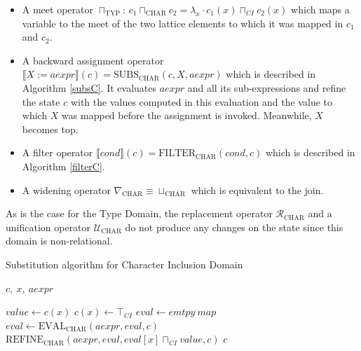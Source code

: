 \documentclass[10pt]{report}
\begin{document}
\begin{itemize}
	\item A meet operator $ \sqcap_{\mathrm{TYP}} $: $ c_{1} \sqcap_{\mathrm{CHAR}} c_{2} = \lambda_{x}\cdot c_{1}(x) \sqcap_{CI} c_{2}(x) $ which maps a variable to the meet of the two lattice elements to which it was mapped in $ c_{1} $ and $ c_{2} $. 
	\item A backward assignment operator $ \llbracket X:=aexpr \rrbracket(c) = \mathrm{SUBS}_{\mathrm{CHAR}}(c, X, aexpr)$ which is described in Algorithm \ref{subsC}. It evaluates $ aexpr $ and all its sub-expressions and refine the state $ c $ with the values computed in this evaluation and the value to which $ X $ was mapped before the assignment is invoked. Meanwhile, $ X $ becomes top.
	
	\item A filter operator $ \llbracket cond \rrbracket(c) =  \mathrm{FILTER}_{\mathrm{CHAR}}(cond, c)$ which is described in Algorithm \ref{filterC}.
	\item A widening operator $ \nabla_{\mathrm{CHAR}} \equiv \sqcup_{\mathrm{CHAR}} $ which is equivalent to the join. 

\end{itemize}
 
As is the case for the Type Domain, the replacement operator $ \mathcal{R}_{\mathrm{CHAR}} $ and a unification operator $ \mathcal{U}_{\mathrm{CHAR}} $ do not produce any changes on the state since this domain is non-relational. 

\begin{algorithm}[H]
	\caption{Substitution algorithm for Character Inclusion Domain} \label{subsC}
	\begin{algorithmic}
		 {$c,\  x,\ aexpr $}
		
		\State $ value \gets c(x) $
		\State $ c(x) \gets \top_{CI} $
		\State $ eval \gets emtpy\ map$
		\State $ eval \gets \mathrm{EVAL}_{\mathrm{CHAR}}(aexpr, eval, c) $
		\State $ \mathrm{REFINE}_{\mathrm{CHAR}}(aexpr, eval, eval[x] \sqcap_{CI} value, c) $
		\State \Return $ c $
		\EndFunction
	\end{algorithmic}
\end{algorithm}
\end{document}
